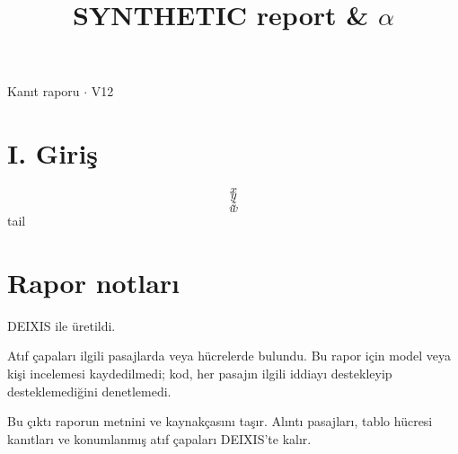 \documentclass[journal]{IEEEtran}
\begin{document}
\renewcommand{\abstractname}{Özet}
\renewcommand{\IEEEkeywordsname}{Dizin Terimleri}
\renewcommand{\refname}{Kaynaklar}

\title{SYNTHETIC report \& \ensuremath{\alpha}}

\maketitle

\noindent Kanıt raporu \ensuremath{\cdot} V12

\section*{I. Giriş}

\begin{equation*}
x
\end{equation*}
\begin{equation*}
y
\end{equation*}
\cite{Synth26}
\begin{equation*}
z
\end{equation*}
\cite{Synth26}
\begin{equation*}
w
\end{equation*}
tail \cite{Synth26}

\section*{Rapor notları}

DEIXIS ile üretildi.

Atıf çapaları ilgili pasajlarda veya hücrelerde bulundu. Bu rapor için model veya kişi incelemesi kaydedilmedi; kod, her pasajın ilgili iddiayı destekleyip desteklemediğini denetlemedi.

Bu çıktı raporun metnini ve kaynakçasını taşır. Alıntı pasajları, tablo hücresi kanıtları ve konumlanmış atıf çapaları DEIXIS'te kalır.




\end{document}
